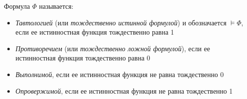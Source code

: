 \begin{definition}
    Формула $\Phi$ называется:
    \begin{itemize}
        \item \textit{Тавтологией} (или \textit{тождественно истинной формулой}) и обозначается $\vDash\Phi$, если ее истинностная функция тождественно равна 1
        \item \textit{Противоречием} (или \textit{тождественно ложной формулой}), если ее истинностная функция тождественно равна 0
        \item \textit{Выполнимой}, если ее истинностная функция не равна тождественно 0
        \item \textit{Опровержимой}, если ее истинностная функция не равна тождественно 1
    \end{itemize}
\end{definition}